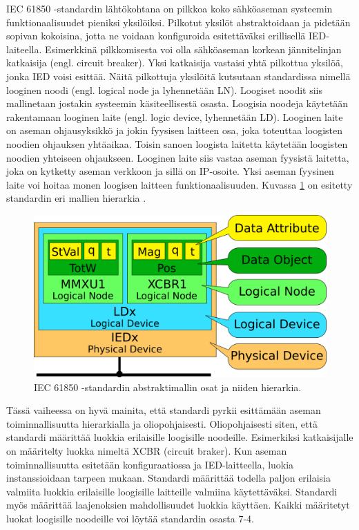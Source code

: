 IEC 61850 -standardin lähtökohtana on pilkkoa koko sähköaseman systeemin funktionaalisuudet pieniksi yksilöiksi. Pilkotut yksilöt abstraktoidaan ja pidetään sopivan kokoisina, jotta ne voidaan konfiguroida esitettäväksi erillisellä IED-laiteella. Esimerkkinä pilkkomisesta voi olla sähköaseman korkean jännitelinjan katkaisija (engl. circuit breaker). Yksi katkaisija vastaisi yhtä pilkottua yksilöä, jonka IED voisi esittää. Näitä pilkottuja yksilöitä kutsutaan standardissa nimellä looginen noodi (engl. logical node ja lyhennetään LN). Loogiset noodit siis mallinetaan jostakin systeemin käsiteellisestä osasta. Loogisia noodeja käytetään rakentamaan looginen laite (engl. logic device, lyhennetään LD). Looginen laite on aseman ohjausyksikkö ja jokin fyysisen laitteen osa, joka toteuttaa loogisten noodien ohjauksen yhtäaikaa. Toisin sanoen loogista laitetta käytetään loogisten noodien yhteiseen ohjaukseen. Looginen laite siis vastaa aseman fyysistä laitetta, joka on kytketty aseman verkkoon ja sillä on IP-osoite. Yksi aseman fyysinen laite voi hoitaa monen loogisen laitteen funktionaalisuuden. Kuvassa \ref{fig:iec61850-data-modeling} on esitetty standardin eri mallien hierarkia \cite[s.~2]{Camachi2017} \cite[s.~24]{IEC61850-1}.

\begin{figure}
	\includegraphics[width=1\textwidth]{pictures/iec61850-data-modeling.png}
	\caption{IEC 61850 -standardin abstraktimallin osat ja niiden hierarkia.}
	\label{fig:iec61850-data-modeling}
\end{figure}

Tässä vaiheessa on hyvä mainita, että standardi pyrkii esittämään aseman toiminnallisuutta hierarkialla ja oliopohjaisesti. Oliopohjaisesti siten, että  standardi määrittää luokkia erilaisille loogisille noodeille. Esimerkiksi katkaisijalle on määritelty luokka nimeltä XCBR (circuit braker). Kun aseman toiminnallisuutta esitetään konfiguraatiossa ja IED-laitteella, luokia instanssioidaan tarpeen mukaan. Standardi määrittää todella paljon erilaisia valmiita luokkia erilaisille loogisille laitteille valmiina käytettäväksi. Standardi myös määrittää laajenoksien mahdollisuudet luokkia käyttäen. Kaikki määritetyt luokat loogisille noodeille voi löytää standardin osasta 7-4. 

